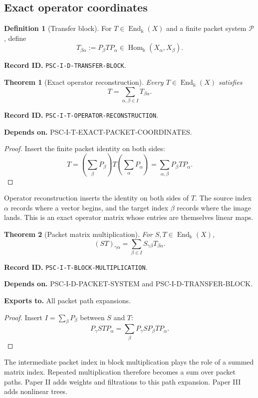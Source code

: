 \documentclass[11pt]{article}
\newtheorem{theorem}{Theorem}[section]
\theoremstyle{definition}
\newtheorem{definition}[definition]{Definition}
\theoremstyle{remark}
\newcommand{\bbk}{\Bbbk}
\newcommand{\Pcal}{\mathcal P}
\newcommand{\End}{\operatorname{End}}
\newcommand{\Hom}{\operatorname{Hom}}
\newcommand{\RecordID}[1]{\par\smallskip\noindent\begingroup\footnotesize\color{PSCGray}\raggedright\textbf{Record ID.} \nolinkurl{#1}.\par\endgroup}
\newcommand{\Depends}[1]{\par\noindent\begingroup\footnotesize\color{PSCGray}\raggedright\textbf{Depends on.} #1\par\endgroup}
\newcommand{\Exports}[1]{\par\noindent\begingroup\footnotesize\color{PSCGray}\raggedright\textbf{Exports to.} #1\par\endgroup}
\begin{document}
\subsection{Exact operator coordinates}

\begin{definition}[Transfer block]
\label{def:transfer-block}
For $T\in\End_{\bbk}(X)$ and a finite packet system $\Pcal$, define
\[
T_{\beta\alpha}:=P_\beta TP_\alpha
\in\Hom_{\bbk}(X_\alpha,X_\beta).
\]
\end{definition}
\RecordID{PSC-I-D-TRANSFER-BLOCK}

\begin{theorem}[Exact operator reconstruction]
\label{thm:operator-reconstruction}
Every $T\in\End_{\bbk}(X)$ satisfies
\[
\boxed{T=\sum_{\alpha,\beta\in I}T_{\beta\alpha}.}
\]
\end{theorem}
\RecordID{PSC-I-T-OPERATOR-RECONSTRUCTION}
\Depends{PSC-I-T-EXACT-PACKET-COORDINATES.}

\begin{proof}
Insert the finite packet identity on both sides:
\[
T=
\left(\sum_\beta P_\beta\right)
T
\left(\sum_\alpha P_\alpha\right)
=
\sum_{\alpha,\beta}P_\beta TP_\alpha.
\]
\end{proof}

\begin{interpretation}
Operator reconstruction inserts the identity on both sides of \(T\).  The source index \(\alpha\) records where a vector begins, and the target index \(\beta\) records where the image lands.  This is an exact operator matrix whose entries are themselves linear maps.
\end{interpretation}


\begin{theorem}[Packet matrix multiplication]
\label{thm:block-multiplication}
For $S,T\in\End_{\bbk}(X)$,
\[
\boxed{
(ST)_{\gamma\alpha}
=
\sum_{\beta\in I}S_{\gamma\beta}T_{\beta\alpha}.
}
\]
\end{theorem}
\RecordID{PSC-I-T-BLOCK-MULTIPLICATION}
\Depends{PSC-I-D-PACKET-SYSTEM and PSC-I-D-TRANSFER-BLOCK.}
\Exports{All packet path expansions.}

\begin{proof}
Insert $I=\sum_\beta P_\beta$ between $S$ and $T$:
\[
P_\gamma STP_\alpha
=
\sum_\beta
P_\gamma SP_\beta TP_\alpha.
\]
\end{proof}

\begin{keyidea}
The intermediate packet index in block multiplication plays the role of a summed matrix index.  Repeated multiplication therefore becomes a sum over packet paths.  Paper II adds weights and filtrations to this path expansion.  Paper III adds nonlinear trees.
\end{keyidea}
\end{document}
